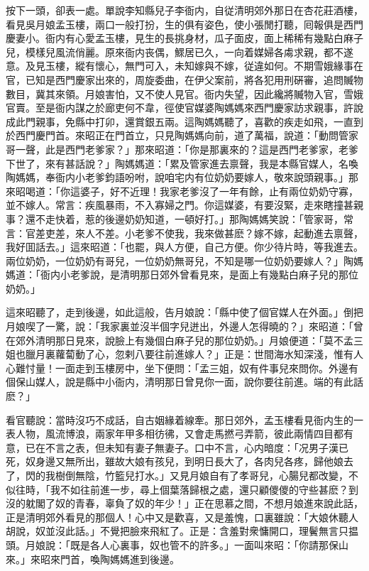 按下一頭，卻表一處。單說李知縣兒子李衙内，自従清明郊外那日在杏花莊酒樓，看見吳月娘孟玉樓，兩口一般打扮，生的俱有姿色，使小張閒打聽，囘報俱是西門慶妻小。衙内有心愛孟玉樓，見生的長挑身材，瓜子面皮，面上稀稀有幾點白麻子兒，模樣兒風流俏麗。原來衙内丧偶，鰥居已久，一向着媒婦各䖏求親，都不遂意。及見玉樓，縱有懷心，無門可入，未知嫁與不嫁，従違如何。不期雪娥緣事在官，已知是西門慶家出來的，周旋委曲，在伊父案前，將各犯用刑硏審，追問贓物數目，冀其來領。月娘害怕，又不使人見官。衙内失望，因此纔將贓物入官，雪娥官賣。至是衙内謀之於廊吏何不韋，徑使官媒婆陶媽媽來西門慶家訪求親事，許說成此門親事，免縣中打卯，還賞銀五兩。這陶媽媽聽了，喜歡的疾走如飛，一直到於西門慶門首。來昭正在門首立，只見陶媽媽向前，道了萬福，說道：「動問管家哥一聲，此是西門老爹家？」那來昭道：「你是那裏來的？這是西門老爹家，老爹下世了，來有甚話說？」陶媽媽道：「累及管家進去禀聲，我是本縣官媒人，名喚陶媽媽，奉衙内小老爹鈞語吩咐，說咱宅内有位奶奶要嫁人，敬來說頭親事。」那來昭喝道：「你這婆子，好不近理！我家老爹沒了一年有餘，止有兩位奶奶守寡，並不嫁人。常言：疾風暴雨，不入寡婦之門。你這媒婆，有要沒緊，走來瞎撞甚親事？還不走快着，惹的後邊奶奶知道，一頓好打。」那陶媽媽笑說：「管家哥，常言：官差吏差，來人不差。小老爹不使我，我來做甚麽？嫁不嫁，起動進去禀聲，我好囬話去。」這來昭道：「也罷，與人方便，自己方便。你少待片時，等我進去。兩位奶奶，一位奶奶有哥兒，一位奶奶無哥兒，不知是哪一位奶奶要嫁人？」陶媽媽道：「衙内小老爹說，是清明那日郊外曾看見來，是面上有幾點白麻子兒的那位奶奶。」

這來昭聽了，走到後邊，如此這般，告月娘說：「縣中使了個官媒人在外面。」倒把月娘喫了一驚，說：「我家裏並沒半個字兒迸出，外邊人怎得曉的？」來昭道：「曾在郊外清明那日見來，說臉上有幾個白麻子兒的那位奶奶。」月娘便道：「莫不孟三姐也臘月裏蘿蔔動了心，忽剌八要往前進嫁人？」正是：世間海水知深淺，惟有人心難忖量！一面走到玉樓房中，坐下便問：「孟三姐，奴有件事兒來問你。外邊有個保山媒人，說是縣中小衙内，清明那日曾見你一面，說你要往前進。端的有此話麽？」

看官聽說：當時沒巧不成話，自古姻緣着線牽。那日郊外，孟玉樓看見衙内生的一表人物，風流博浪，兩家年甲多相彷彿，又會走馬撚弓弄箭，彼此兩情四目都有意，已在不言之表，但未知有妻子無妻子。口中不言，心内暗度：「况男子漢已死，奴身邊又無所出，雖故大娘有孩兒，到明日長大了，各肉兒各疼，歸他娘去了，閃的我樹倒無陰，竹籃兒打水。」又見月娘自有了孝哥兒，心腸兒都改變，不似往時，「我不如往前進一步，尋上個葉落歸根之處，還只顧儍儍的守些甚麽？到沒的躭閣了奴的青春，辜負了奴的年少！」正在思慕之間，不想月娘進來說此話，正是清明郊外看見的那個人！心中又是歡喜，又是羞愧，口裏雖說：「大娘休聽人胡說，奴並沒此話。」不覺把臉來飛紅了。正是：含羞對衆慵開口，理鬢無言只揾頭。月娘說：「既是各人心裏事，奴也管不的許多。」一面叫來昭：「你請那保山來。」來昭來門首，喚陶媽媽進到後邊。

